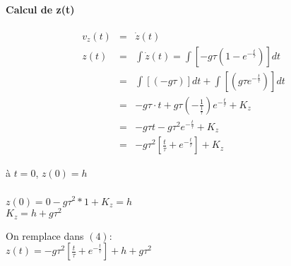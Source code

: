 			\paragraph{Calcul de z(t)}

			\[\begin{array}{rcl}
					v_z(t) &=& \dot{z}(t) \\
					z(t) &=& \int{\dot{z}(t)} = \int{[-g\tau (1-e^{-\frac{t}{\tau}})]dt} \\
							   &=& \int{[(-g\tau)]dt + \int[(g\tau e^{-\frac{t}{\tau}})]dt} \\
							   &=& -g\tau \cdot t + g\tau(-\frac{1}{\frac{1}{\tau}})e^{-\frac{t}{\tau}}+K_z \\
							   &=& -g\tau t - g\tau^2 e^{-\frac{t}{\tau}} + K_z \\
						 &=& -g\tau ^2 [\frac{t}{\tau}+ e^{-\frac{t}{\tau}}] + K_z
			\end{array}\]
		

			à $t=0$, $z(0)=h$ ~\\
			~\\
			$z(0) = 0 - g\tau ^2*1+K_z = h$ ~\\
			$K_z = h+g\tau ^2$

			\begin{center}

			On remplace dans $(4)$: ~\\
			$z(t) = -g\tau ^2 [\frac{t}{\tau}+e^{-\frac{t}{\tau}}]+h+g\tau ^2$

		\end{center}
